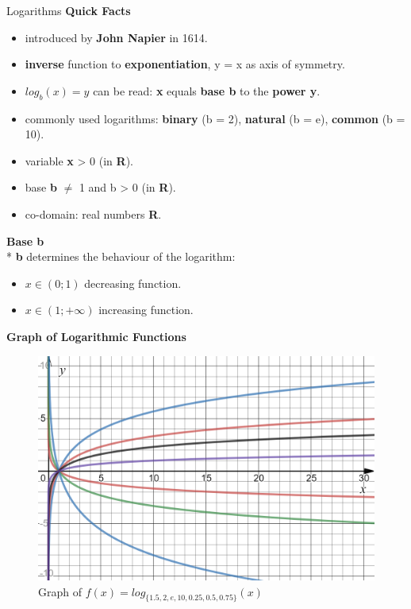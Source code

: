 \documentclass[final]{beamer}
\newlength{\onecolwid}
\begin{document}
\begin{frame}[t]
\begin{columns}[t]
\begin{column}{\onecolwid}
\begin{block}{Logarithms}
\textbf{Quick Facts}
\begin{itemize}
\item introduced by \textbf{John Napier} in 1614.
\item \textbf{inverse} function to \textbf{exponentiation}, y = x as axis of symmetry.
\item $log_b(x) = y$ can be read: \textbf{x} equals \textbf{base b} to the \textbf{power y}.
\item commonly used logarithms: \textbf{binary} (b = 2), \textbf{natural} (b = e), \textbf{common} (b = 10).
\item variable \textbf{x} {\textgreater} 0 (in \textbf{R}).
\item base \textbf{b} ${\neq}$ 1 and b {\textgreater} 0 (in \textbf{R}).
\item co-domain: real numbers \textbf{R}.

\end{itemize}

\textbf{Base b}\\*
\textbf{b} determines the behaviour of the logarithm:
\begin{itemize}
\item $x\in(0;1)$ decreasing function.
\item $x\in(1; +\infty)$ increasing function.
\end{itemize}

\textbf{Graph of Logarithmic Functions}
\end{block}

\begin{figure}
\includegraphics[width=1\linewidth]{m_rec_m.png}
\caption{Graph of $f(x)=log_{\{1.5, 2, e, 10, 0.25, 0.5, 0.75\}}(x)$}
\end{figure}


\end{column}
\end{columns}
\end{frame}
\end{document}
